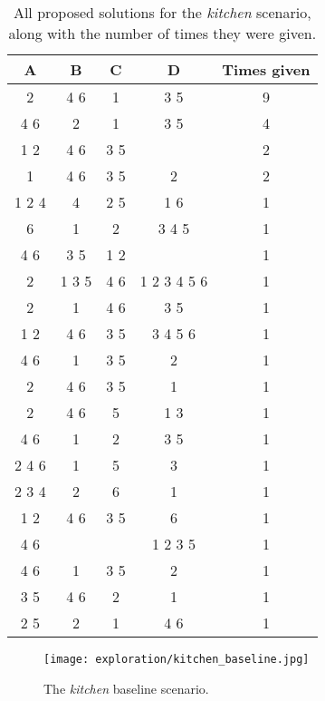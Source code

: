 \begin{table}
    \centering
    \begin{tabular}{|c|c|c|c|c|} 
    \hline
    A     & B     & C   & D           & Times given \\
    \hline
    2     & 4 6   & 1   & 3 5         & 9 \\
    4 6   & 2     & 1   & 3 5         & 4 \\
    1 2   & 4 6   & 3 5 &             & 2 \\
    1     & 4 6   & 3 5 & 2           & 2 \\
    1 2 4 & 4     & 2 5 & 1 6         & 1 \\
    6     & 1     & 2   & 3 4 5       & 1 \\
    4 6   & 3 5   & 1 2 &             & 1 \\
    2     & 1 3 5 & 4 6 & 1 2 3 4 5 6 & 1 \\
    2     & 1     & 4 6 & 3 5         & 1 \\
    1 2   & 4 6   & 3 5 & 3 4 5 6     & 1 \\
    4 6   & 1     & 3 5 & 2           & 1 \\
    2     & 4 6   & 3 5 & 1           & 1 \\
    2     & 4 6   & 5   & 1 3         & 1 \\
    4 6   & 1     & 2   & 3 5         & 1 \\
    2 4 6 & 1     & 5   & 3           & 1 \\
    2 3 4 & 2     & 6   & 1           & 1 \\
    1 2   & 4 6   & 3 5 & 6           & 1 \\
    4 6   &       &     & 1 2 3 5     & 1 \\
    4 6   & 1     & 3 5 & 2           & 1 \\
    3 5   & 4 6   & 2   & 1           & 1 \\
    2 5   & 2     & 1   & 4 6         & 1 \\
    \hline
\end{tabular}
\caption{All proposed solutions for the \textit{kitchen} scenario, along with the number of times they were given.}
\label{table:kitchen_answers}
\end{table}

\begin{figure}
    \centering
    \texttt{[image: exploration/kitchen\_baseline.jpg]}
    \caption{The \textit{kitchen} baseline scenario.}
    \label{fig:explor:kitchen_baseline_again}
\end{figure}

